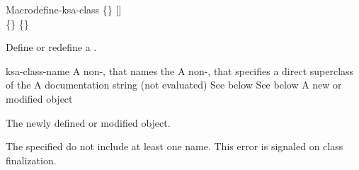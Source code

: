 \documentclass[10pt,twoside,english,pdftex]{article}
\begin{document}
\begin{functiondoc}{Macro}{define-ksa-class}%
   { 
   \code{(}\{\}\superstar\code{)}
   [] \\
   \code{(}\{\}\superstar\code{)}
   \{\}\superstar{}
   \returns{} }
%
%
%

\fnsyntax

\fnpurpose Define or redefine a .

\fnpackage {}

\fnmodule {}

\fnargs
\begin{args}{ksa-class-name}
 A non-\nil,  that names the
 A non-\nil,  that specifies a
direct superclass of the  
\arg[documentation] A documentation string (not evaluated)
 See below
 See below
 A new or modified  object
\end{args}

\fnreturns The newly defined or modified  object.

\fnerrors The specified  do not include at
least one  name.  This error is signaled on class
finalization.


\end{functiondoc}
\end{document}
